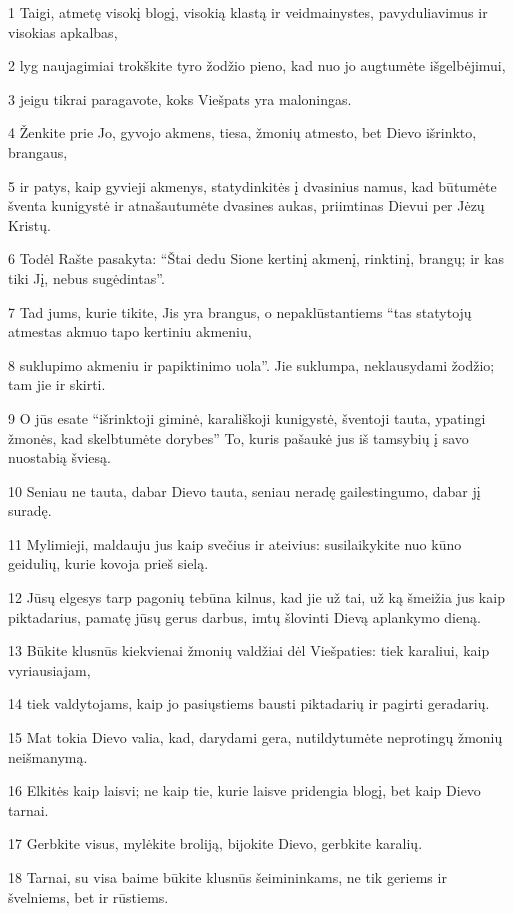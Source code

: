 \par 1 Taigi, atmetę visokį blogį, visokią klastą ir veidmainystes, pavyduliavimus ir visokias apkalbas, 
\par 2 lyg naujagimiai trokškite tyro žodžio pieno, kad nuo jo augtumėte išgelbėjimui, 
\par 3 jeigu tikrai paragavote, koks Viešpats yra maloningas. 
\par 4 Ženkite prie Jo, gyvojo akmens, tiesa, žmonių atmesto, bet Dievo išrinkto, brangaus, 
\par 5 ir patys, kaip gyvieji akmenys, statydinkitės į dvasinius namus, kad būtumėte šventa kunigystė ir atnašautumėte dvasines aukas, priimtinas Dievui per Jėzų Kristų. 
\par 6 Todėl Rašte pasakyta: “Štai dedu Sione kertinį akmenį, rinktinį, brangų; ir kas tiki Jį, nebus sugėdintas”. 
\par 7 Tad jums, kurie tikite, Jis yra brangus, o nepaklūstantiems “tas statytojų atmestas akmuo tapo kertiniu akmeniu, 
\par 8 suklupimo akmeniu ir papiktinimo uola”. Jie suklumpa, neklausydami žodžio; tam jie ir skirti. 
\par 9 O jūs esate “išrinktoji giminė, karališkoji kunigystė, šventoji tauta, ypatingi žmonės, kad skelbtumėte dorybes” To, kuris pašaukė jus iš tamsybių į savo nuostabią šviesą. 
\par 10 Seniau ne tauta, dabar Dievo tauta, seniau neradę gailestingumo, dabar jį suradę. 
\par 11 Mylimieji, maldauju jus kaip svečius ir ateivius: susilaikykite nuo kūno geidulių, kurie kovoja prieš sielą. 
\par 12 Jūsų elgesys tarp pagonių tebūna kilnus, kad jie už tai, už ką šmeižia jus kaip piktadarius, pamatę jūsų gerus darbus, imtų šlovinti Dievą aplankymo dieną. 
\par 13 Būkite klusnūs kiekvienai žmonių valdžiai dėl Viešpaties: tiek karaliui, kaip vyriausiajam, 
\par 14 tiek valdytojams, kaip jo pasiųstiems bausti piktadarių ir pagirti geradarių. 
\par 15 Mat tokia Dievo valia, kad, darydami gera, nutildytumėte neprotingų žmonių neišmanymą. 
\par 16 Elkitės kaip laisvi; ne kaip tie, kurie laisve pridengia blogį, bet kaip Dievo tarnai. 
\par 17 Gerbkite visus, mylėkite broliją, bijokite Dievo, gerbkite karalių. 
\par 18 Tarnai, su visa baime būkite klusnūs šeimininkams, ne tik geriems ir švelniems, bet ir rūstiems. 
